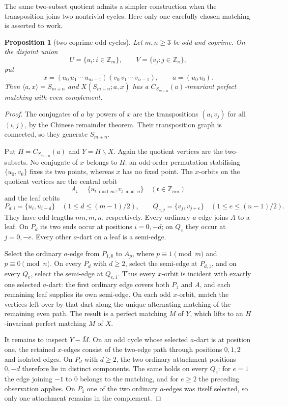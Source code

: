 \documentclass[11pt,a4paper]{article}
\newtheorem{proposition}[theorem]{Proposition}
\theoremstyle{definition}
\theoremstyle{remark}
\newcommand{\ZZ}{\mathbb{Z}}
\newcommand{\X}[3]{X(#1;#2,#3)}
\begin{document}
The same two-subset quotient admits a simpler construction when the transposition joins two nontrivial cycles.  Here only one carefully chosen matching is asserted to work.
\begin{proposition}[two coprime odd cycles]\label{prop:two-cycle-transposition}
Let $m,n\ge3$ be odd and coprime.  On the disjoint union
\[
 U=\{u_i:i\in\ZZ_m\},\qquad V=\{v_j:j\in\ZZ_n\},
\]
put
\[
 x=(u_0\,u_1\,\cdots\,u_{m-1})(v_0\,v_1\,\cdots\,v_{n-1}),
 \qquad a=(u_0\,v_0).
\]
Then $\langle a,x\rangle=S_{m+n}$ and $\X{S_{m+n}}{a}{x}$ has a $C_{S_{m+n}}(a)$-invariant perfect matching with even complement.
\end{proposition}
\begin{proof}
The conjugates of $a$ by powers of $x$ are the transpositions $(u_i\,v_j)$ for all $(i,j)$, by the Chinese remainder theorem.  Their transposition graph is connected, so they generate $S_{m+n}$.

Put $H=C_{S_{m+n}}(a)$ and $Y=H\backslash X$.  Again the quotient vertices are the two-subsets.  No conjugate of $x$ belongs to $H$: an odd-order permutation stabilising $\{u_0,v_0\}$ fixes its two points, whereas $x$ has no fixed point.  The $x$-orbits on the quotient vertices are the central orbit
\[
 A_t=\{u_{t\bmod m},v_{t\bmod n}\}\quad(t\in\ZZ_{mn})
\]
and the leaf orbits
\[
 P_{d,i}=\{u_i,u_{i+d}\}\quad
 (1\le d\le(m-1)/2),\qquad
 Q_{e,j}=\{v_j,v_{j+e}\}\quad
 (1\le e\le(n-1)/2).
\]
They have odd lengths $mn,m,n$, respectively.  Every ordinary $a$-edge joins $A$ to a leaf.  On $P_d$ its two ends occur at positions $i=0,-d$; on $Q_e$ they occur at $j=0,-e$.  Every other $a$-dart on a leaf is a semi-edge.

Select the ordinary $a$-edge from $P_{1,0}$ to $A_p$, where $p\equiv1\pmod m$ and $p\equiv0\pmod n$.  On every $P_d$ with $d\ge2$, select the semi-edge at $P_{d,1}$, and on every $Q_e$, select the semi-edge at $Q_{e,1}$.  Thus every $x$-orbit is incident with exactly one selected $a$-dart: the first ordinary edge covers both $P_1$ and $A$, and each remaining leaf supplies its own semi-edge.  On each odd $x$-orbit, match the vertices left over by that dart along the unique alternating matching of the remaining even path.  The result is a perfect matching $\bar M$ of $Y$, which lifts to an $H$-invariant perfect matching $M$ of $X$.

It remains to inspect $Y-\bar M$.  On an odd cycle whose selected $a$-dart is at position one, the retained $x$-edges consist of the two-edge path through positions $0,1,2$ and isolated edges.  On $P_d$ with $d\ge2$, the two ordinary attachment positions $0,-d$ therefore lie in distinct components.  The same holds on every $Q_e$: for $e=1$ the edge joining $-1$ to $0$ belongs to the matching, and for $e\ge2$ the preceding observation applies.  On $P_1$ one of the two ordinary $a$-edges was itself selected, so only one attachment remains in the complement.


\end{proof}
\end{document}
